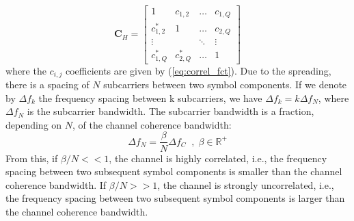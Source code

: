 \documentclass[12pt]{article}
\begin{document}
\begin{equation}
\textbf{C}_H = 
\begin{bmatrix}
	1 & c_{1,2} & \hdots & c_{1,Q}  \\
	c_{1,2}^* & 1 & \hdots & c_{2,Q} \\
	\vdots & & \ddots & \vdots \\
	c_{1,Q}^* & c_{2,Q}^* & \hdots & 1
\end{bmatrix}
\label{eq:correl_mat}
\end{equation}
where the $c_{i,j}$ coefficients are given by (\ref{eq:correl_fct}).  Due to the spreading, there is a spacing of $N$ subcarriers between two symbol components.  If we denote by $\Delta f_{k}$ the frequency spacing between k subcarriers, we have $\Delta f_{k} = k \Delta f_N$, where $\Delta f_N$ is the subcarrier bandwidth. The subcarrier bandwidth is a fraction, depending on $N$, of the channel coherence bandwidth:
\begin{equation}
	\Delta f_N = \frac{\beta}{N} \Delta f_C \; \; , \; \beta \in \mathbb{R}^+
	\label{eq:subcar_BW}
\end{equation}
From this, if $\beta/N << 1$, the channel is highly correlated, i.e., the frequency spacing between two subsequent symbol components is smaller than the channel coherence bandwidth. If $\beta/N >> 1$, the channel is strongly uncorrelated, i.e., the frequency spacing between two subsequent symbol components is larger than the channel coherence bandwidth.
\end{document}
